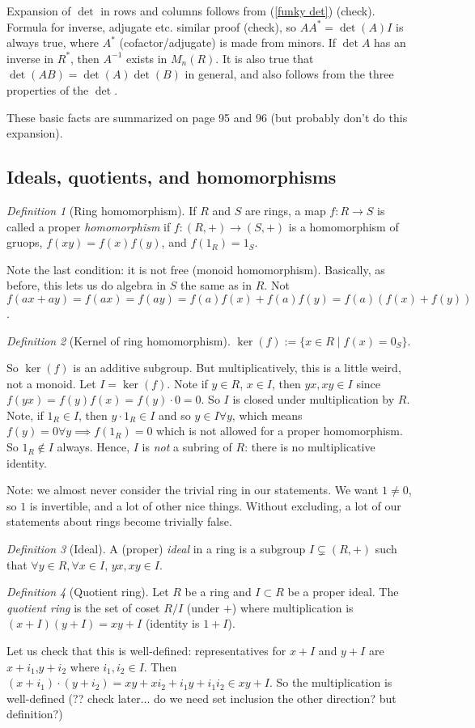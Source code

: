 \documentclass{article}
\theoremstyle{plain}
\theoremstyle{remark}
\newtheorem{definition}{Definition}
\begin{document}
Expansion of $\det$ in rows and columns follows from (\ref{funky det}) (check).
Formula for inverse, adjugate etc. similar proof (check),
so $AA^* = \det(A)I$ is always true,
where $A^*$ (cofactor/adjugate) is made from minors.
If $\det{A}$ has an inverse in $R^*$,
then $A^{-1}$ exists in $M_n(R)$.
It is also true that $\det(AB) = \det(A)\det(B)$ in general,
and also follows from the three properties of the $\det$.

These basic facts are summarized on page 95 and 96 (but probably don't do this expansion).

\subsection{Ideals, quotients, and homomorphisms}
\begin{definition}[Ring homomorphism]
	If $R$ and $S$ are rings, a map $f \colon R \to S$ is
	called a proper \emph{homomorphism}
	if $f \colon (R,+) \to (S,+)$ is a homomorphism of gruops,
	$f(xy) = f(x)f(y)$,
	and $f(1_R) = 1_S$.
\end{definition}
Note the last condition: it is not free (monoid homomorphism).
Basically, as before, this lets us do algebra in $S$ the same as in $R$.
Not $f(ax + ay) = f(ax) = f(ay) = f(a)f(x) + f(a)f(y) = f(a)(f(x) + f(y))$.
\begin{definition}[Kernel of ring homomorphism]
	$\ker(f) := \{x \in R \mid f(x) = 0_S\}$.
\end{definition}
So $\ker(f)$ is an additive subgroup.
But multiplicatively, this is a little weird, not a monoid.
Let $I = \ker(f)$.
Note if $y\in R$, $x \in I$, then $yx, xy \in I$
since $f(yx) = f(y)f(x) = f(y)\cdot 0 = 0$.
So $I$ is closed under multiplication by $R$.
Note, if $1_R \in I$, then $y \cdot 1_R \in I$ and so $y \in I \forall y$,
which means $f(y) = 0 \forall y \implies f(1_R) = 0$ which
is not allowed for a proper homomorphism.
So $1_R \not\in I$ always.
Hence, $I$ is \emph{not} a subring of $R$: there is no multiplicative identity.

Note: we almost never consider the trivial ring in our statements.
We want $1 \neq 0$, so $1$ is invertible, and a lot of other nice things.
Without excluding, a lot of our statements about rings become trivially false.

\begin{definition}[Ideal]
	A (proper) \emph{ideal} in a ring is a subgroup $I \subsetneq (R,+)$
	such that $\forall y \in R, \forall x \in I$, $yx,xy \in I$.
\end{definition}
\begin{definition}[Quotient ring]
	Let $R$ be a ring and $I \subset R$ be a proper ideal.
	The \emph{quotient ring} is the set of coset $R/I$ (under $+$)
	where multiplication is $(x+I)(y+I) = xy + I$
	(identity is $1 + I$).
\end{definition}
Let us check that this is well-defined:
representatives for $x + I$ and $y + I$ are $x + i_1$,$y+i_2$ where $i_1,i_2\in I$.
Then $(x + i_1)\cdot(y + i_2) = xy + xi_2 + i_1y + i_1i_2 \in xy + I$.
So the multiplication is well-defined (?? check later... do we need
set inclusion the other direction? but definition?)
\end{document}
